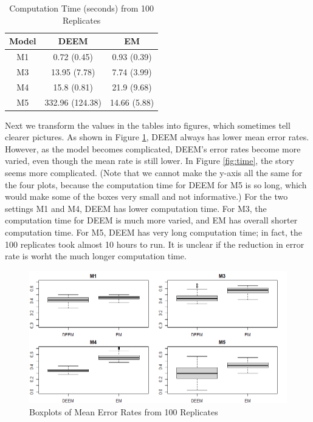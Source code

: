 \documentclass[11pt]{article}
\begin{document}
\begin{table}[H]
    \centering
    \begin{tabular}{c|cc}
       Model  &  DEEM & EM \\
       \hline
         M1 & 0.72 (0.45) & 0.93 (0.39) \\
         M3 &  13.95 (7.78) & 7.74 (3.99) \\
         M4 &  15.8 (0.81) & 21.9 (9.68) \\ 
         M5 &  332.96 (124.38) & 14.66 (5.88) \\
    \end{tabular}
    \caption{Computation Time (seconds) from 100 Replicates}
    \label{tab:time}
\end{table}

Next we transform the values in the tables into figures, which sometimes tell clearer pictures. As shown in Figure \ref{fig:err}, DEEM always has lower mean error rates. However, as the model becomes complicated, DEEM's error rates become more varied, even though the mean rate is still lower. In Figure \ref{fig:time}, the story seems more complicated. (Note that we cannot make the y-axis all the same for the four plots, because the computation time for DEEM for M5 is so long, which would make some of the boxes very small and not informative.) For the two settings M1 and M4, DEEM has lower computation time. For M3, the computation time for DEEM is much more varied, and EM has overall shorter computation time. For M5, DEEM has very long computation time; in fact, the 100 replicates took almost 10 hours to run. It is unclear if the reduction in error rate is worht the much longer computation time.

\begin{figure}[H]
    \centering
    \includegraphics[width = 16 cm]{sim_error.png}
    \caption{Boxplots of Mean Error Rates from 100 Replicates}
    \label{fig:err}
\end{figure}
\end{document}
